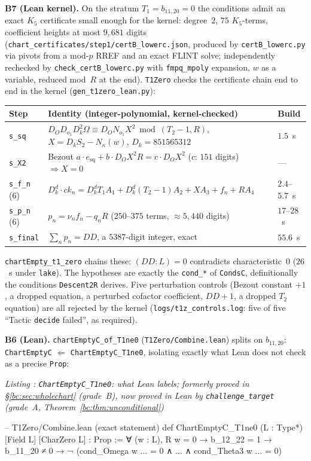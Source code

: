 \documentclass[a4paper,11pt]{article}
\newcounter{leanlisting}
\newenvironment{leanlisting}[2]{%
  \refstepcounter{leanlisting}\label{#2}%
  \begin{center}\textit{\small Listing \theleanlisting: #1}\end{center}%
  \Verbatim[breaklines=true,breakanywhere=true,fontsize=\footnotesize,frame=single,framesep=4pt,rulecolor=\color{gray!50},fillcolor=\color{gray!5}]%
}{%
  \endVerbatim%
}
\theoremstyle{plain}
\theoremstyle{definition}
\theoremstyle{remark}
\begin{document}
\textbf{B7 (Lean kernel).} On the stratum $T_1=b_{11,20}=0$ the conditions admit an exact $K_5$ certificate small enough for the kernel: degree~$2$, $75$ $K_5$-terms, coefficient heights at most $9{,}681$ digits (\texttt{chart\_certificates/step1/certB\_lowerc.json}, produced by \texttt{certB\_lowerc.py} via pivots from a mod-$p$ RREF and an exact FLINT solve; independently rechecked by \texttt{check\_certB\_lowerc.py} with \texttt{fmpq\_mpoly} expansion, $w$ as a variable, reduced mod~$R$ at the end). \texttt{T1Zero} checks the certificate chain end to end in the kernel (\texttt{gen\_t1zero\_lean.py}):
{\footnotesize
\begin{center}
\begin{tabular}{lll}
Step & Identity (integer-polynomial, kernel-checked) & Build \\ \midrule
\texttt{s\_sq} & $D_O D_{o_1} D_k^2\Omega\equiv D_O N_{o_1}X^2\bmod(T_2-1,R)$, $X=D_kS_2-N_\kappa(w)$, $D_k=851565312$ & $1.5$~s \\
\texttt{s\_X2} & Bezout $a\cdot e_{\mathrm{sq}}+b\cdot D_OX^2R=c\cdot D_OX^2$ ($c$: $151$ digits) $\Rightarrow X=0$ & --- \\
\texttt{s\_f\_n} (6) & $D_k^d\cdot ck_n=D_k^dT_1A_1+D_k^d(T_2-1)A_2+XA_3+f_n+RA_4$ & $2.4$--$5.7$~s \\
\texttt{s\_p\_n} (6) & $p_n=\nu_n f_n-q_nR$ ($250$--$375$ terms, $\approx5{,}440$ digits) & $17$--$28$~s \\
\texttt{s\_final} & $\sum_n p_n=DD$, a $5387$-digit integer, exact & $55.6$~s \\
\end{tabular}
\end{center}
}
\texttt{chartEmpty\_t1\_zero} chains these: $(DD:L)=0$ contradicts characteristic~$0$ ($26$~s under \texttt{lake}). The hypotheses are exactly the \texttt{cond\_*} of \texttt{CondsC}, definitionally the conditions \texttt{Descent2R} derives. Five perturbation controls (Bezout constant $+1$, a dropped equation, a perturbed cofactor coefficient, $DD+1$, a dropped $T_2$ equation) are all rejected by the kernel (\texttt{logs/t1z\_controls.log}: five of five ``Tactic \texttt{decide} failed'', as required).

\textbf{B6 (Lean).} \texttt{chartEmptyC\_of\_T1ne0} (\texttt{T1Zero/Combine.lean}) splits on $b_{11,20}$: \texttt{ChartEmptyC} $\Leftarrow$ \texttt{ChartEmptyC\_T1ne0}, isolating exactly what Lean does not check as a precise \texttt{Prop}:
\begin{leanlisting}{\texttt{ChartEmptyC\_T1ne0}: what Lean labels; formerly proved in \S\ref{bc:sec:wholechart} (grade~B), now proved in Lean by \texttt{challenge\_target} (grade~A, Theorem~\ref{bc:thm:unconditional})}{bc:lst:chartempty}
-- T1Zero/Combine.lean (exact statement)
def ChartEmptyC_T1ne0 (L : Type*) [Field L] [CharZero L] : Prop :=
  ∀ (w : L), R w = 0 → b_12_22 = 1 → b_11_20 ≠ 0 →
    ¬ (cond_Omega w ... = 0 ∧ ... ∧ cond_Theta3 w ... = 0)
\end{leanlisting}
\end{document}
